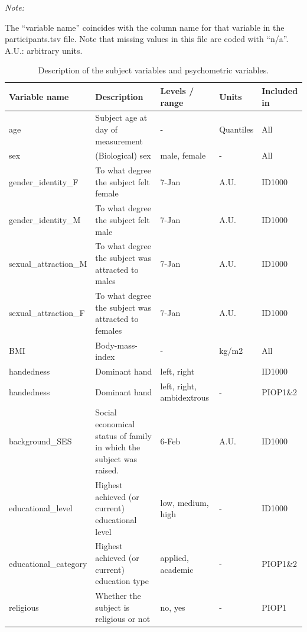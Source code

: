 \documentclass[11pt,american,a4paper,oneside,]{memoir} %
\begin{document}
\begingroup\fontsize{8}{10}\selectfont

\begin{ThreePartTable}
\begin{TableNotes}[para]
\item \textit{Note: } 
\item The “variable name” coincides with the column name for that variable in the participants.tsv file. Note that missing values in this file are coded with “n/a”. A.U.: arbitrary units.
\end{TableNotes}
\begin{longtabu} to 
\caption{\label{tab:tab-aomic-S5}Description of the subject variables and psychometric variables.}\\
\toprule
Variable name & Description & Levels / range & Units & Included in\\
\midrule
age & Subject age at day of measurement & - & Quantiles & All\\
sex & (Biological) sex & male, female & - & All\\
gender\_identity\_F & To what degree the subject felt female & 7-Jan & A.U. & ID1000\\
gender\_identity\_M & To what degree the subject felt male & 7-Jan & A.U. & ID1000\\
sexual\_attraction\_M & To what degree the subject was attracted to males & 7-Jan & A.U. & ID1000\\
\addlinespace
sexual\_attraction\_F & To what degree the subject was attracted to females & 7-Jan & A.U. & ID1000\\
BMI & Body-mass-index & - & kg/m2 & All\\
handedness & Dominant hand & left, right &  & ID1000\\
handedness & Dominant hand & left, right, ambidextrous & - & PIOP1\&2\\
background\_SES & Social economical status of family in which the subject was raised. & 6-Feb & A.U. & ID1000\\
\addlinespace
educational\_level & Highest achieved (or current) educational level & low, medium, high & - & ID1000\\
educational\_category & Highest achieved (or current) education type & applied, academic & - & PIOP1\&2\\
religious & Whether the subject is religious or not & no, yes & - & PIOP1\\

\end{longtabu}
\end{ThreePartTable}
\end{document}
